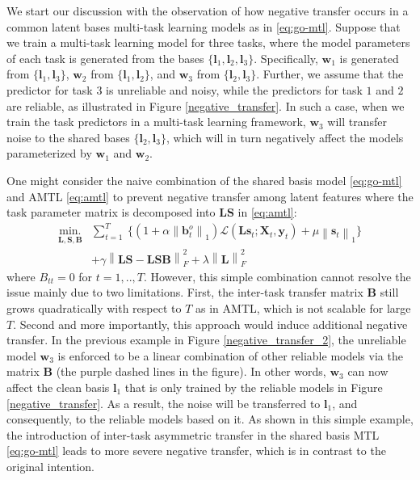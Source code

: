 \documentclass{article}
\newcommand{\vct}[1]{\boldsymbol{#1}} %
\newcommand{\mat}[1]{\boldsymbol{#1}} %
\newcommand{\norm}[1]{\left\|#1\right\|}
\begin{document}
	We start our discussion with the observation of how negative transfer occurs in a common latent bases multi-task learning models as in \eqref{eq:go-mtl}. Suppose that we train a multi-task learning model for three tasks, where the model parameters of each task is generated from the bases $\{\vct{l}_1, \vct{l}_2, \vct{l}_3\}$. Specifically, $\vct{w}_1$ is generated from $\{\vct{l}_1,\vct{l}_3\}$, $\vct{w}_2$ from $\{\vct{l}_1,\vct{l}_2\}$, and $\vct{w}_3$ from $\{\vct{l}_2,\vct{l}_3\}$. Further, we assume that the predictor for task $3$ is unreliable and noisy, while the predictors for task $1$ and $2$ are reliable, as illustrated in Figure \ref{negative_transfer}. In such a case, when we train the task predictors in a multi-task learning framework, $\vct{w}_3$ will transfer noise to the shared bases $\{\vct{l}_2,\vct{l}_3\}$, which will in turn negatively affect the models parameterized by $\vct{w}_1$ and $\vct{w}_2$. 
	
	One might consider the naive combination of the shared basis model \eqref{eq:go-mtl} and AMTL \eqref{eq:amtl} to prevent negative transfer among latent features where the task parameter matrix is decomposed into $\mat{L}\mat{S}$ in \eqref{eq:amtl}: 
	\begin{align}\label{eq:amtl_plus_gomtl}
	\operatorname*{min.}_{\mat{L}, \mat{S}, \mat{B}} &\sum_{t=1}^T \ \Big\{ (1+\alpha\norm{\vct{b}_t^o}_1) \mathcal{L}(\mat{L}\vct{s}_t; \mat{X}_t,\vct{y}_t) + \mu \norm{\vct{s}_t}_1 \Big\} \nonumber\\
	&+ \gamma \norm{\mat{LS}-\mat{LS}\mat{B}}_F^2 + \lambda\norm{\mat{L}}_F^2 
	\end{align}
	where $B_{tt}=0$ for $t=1,..,T$. However, this simple combination cannot resolve the issue mainly due to two limitations. First, the inter-task transfer matrix $\mat{B}$ still grows quadratically with respect to $T$ as in AMTL, which is not scalable for large $T$. Second and more importantly, this approach would induce additional negative transfer. In the previous example in Figure \ref{negative_transfer_2}, the unreliable model $\vct{w}_3$ is enforced to be a linear combination of other reliable models via the matrix $\mat{B}$ (the purple dashed lines in the figure). In other words, $\vct{w}_3$ can now affect the clean basis $\vct{l}_1$ that is only trained by the reliable models in Figure \ref{negative_transfer}. As a result, the noise will be transferred to $\vct{l}_1$, and consequently, to the reliable models based on it. As shown in this simple example, the introduction of inter-task asymmetric transfer in the shared basis MTL \eqref{eq:go-mtl} leads to more severe negative transfer, which is in contrast to the original intention.  
	
\end{document}
